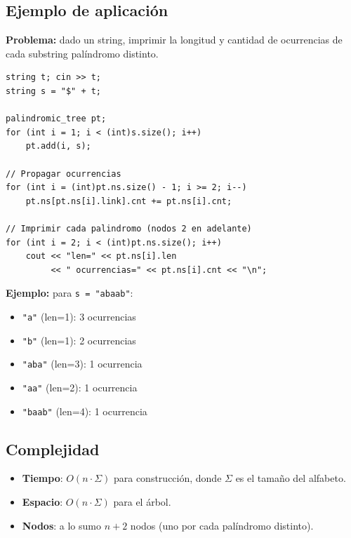 \subsection{Ejemplo de aplicación}

\textbf{Problema:} dado un string, imprimir la longitud y cantidad de ocurrencias de cada substring palíndromo distinto.

\begin{lstlisting}[style=cppstyle, caption={Imprimir todos los palindromos con su frecuencia}]
string t; cin >> t;
string s = "$" + t;

palindromic_tree pt;
for (int i = 1; i < (int)s.size(); i++)
    pt.add(i, s);

// Propagar ocurrencias
for (int i = (int)pt.ns.size() - 1; i >= 2; i--)
    pt.ns[pt.ns[i].link].cnt += pt.ns[i].cnt;

// Imprimir cada palindromo (nodos 2 en adelante)
for (int i = 2; i < (int)pt.ns.size(); i++)
    cout << "len=" << pt.ns[i].len
         << " ocurrencias=" << pt.ns[i].cnt << "\n";
\end{lstlisting}

\textbf{Ejemplo:} para \texttt{s = "abaab"}:
\begin{itemize}
    \item \texttt{"a"} (len=1): 3 ocurrencias
    \item \texttt{"b"} (len=1): 2 ocurrencias
    \item \texttt{"aba"} (len=3): 1 ocurrencia
    \item \texttt{"aa"} (len=2): 1 ocurrencia
    \item \texttt{"baab"} (len=4): 1 ocurrencia
\end{itemize}

\subsection{Complejidad}

\begin{itemize}
    \item \textbf{Tiempo}: $O(n \cdot \Sigma)$ para construcción, donde $\Sigma$ es el tamaño del alfabeto.
    \item \textbf{Espacio}: $O(n \cdot \Sigma)$ para el árbol.
    \item \textbf{Nodos}: a lo sumo $n + 2$ nodos (uno por cada palíndromo distinto).
\end{itemize}